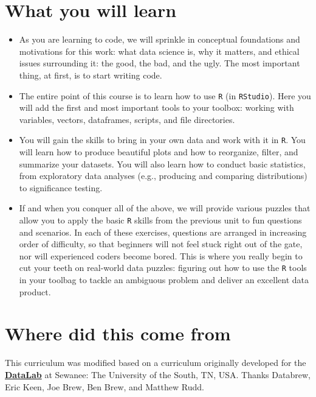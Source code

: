 \documentclass[
]{book}
\begin{document}
\section*{What you will learn}\label{what-you-will-learn}

\begin{itemize}
\item
  As you are learning to code, we will sprinkle in conceptual foundations and motivations for this work: what data science is, why it matters, and ethical issues surrounding it: the good, the bad, and the ugly. The most important thing, at first, is to start writing code.
\item
  The entire point of this course is to learn how to use \texttt{R} (in \texttt{RStudio}). Here you will add the first and most important tools to your toolbox: working with variables, vectors, dataframes, scripts, and file directories.
\item
  You will gain the skills to bring in your own data and work with it in \texttt{R}. You will learn how to produce beautiful plots and how to reorganize, filter, and summarize your datasets. You will also learn how to conduct basic statistics, from exploratory data analyses (e.g., producing and comparing distributions) to significance testing.
\item
  If and when you conquer all of the above, we will provide various puzzles that allow you to apply the basic \texttt{R} skills from the previous unit to fun questions and scenarios. In each of these exercises, questions are arranged in increasing order of difficulty, so that beginners will not feel stuck right out of the gate, nor will experienced coders become bored. This is where you really begin to cut your teeth on real-world data puzzles: figuring out how to use the \texttt{R} tools in your toolbag to tackle an ambiguous problem and deliver an excellent data product.
\end{itemize}

\section*{Where did this come from}\label{where-did-this-come-from}

This curriculum was modified based on a curriculum originally developed for the \href{https://new.sewanee.edu/sewanee-datalab/}{\textbf{DataLab}} at Sewanee: The University of the South, TN, USA. Thanks Databrew, Eric Keen, Joe Brew, Ben Brew, and Matthew Rudd.
\end{document}
